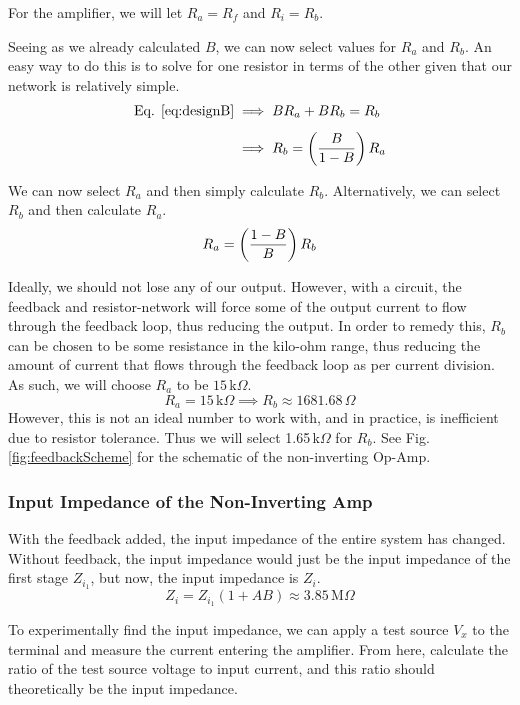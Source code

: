 \documentclass[lettersize,journal]{IEEEtran}
\begin{document}
For the amplifier, we will let $R_a = R_f$ and $R_i = R_b$.

Seeing as we already calculated $B$, we can now select values for $R_a$ and $R_b$. 
An easy way to do this is to solve for one resistor in terms of the other given 
that our network is relatively simple.
\begin{align}
  \text{Eq. \eqref{eq:designB}} &\implies BR_a + BR_b = R_b \\[1ex]
                                &\implies R_b = \left(\frac{B}{1-B}\right) R_a
\end{align}

We can now select $R_a$ and then simply calculate $R_b$. Alternatively, we can 
select $R_b$ and then calculate $R_a$.
\begin{equation}
  R_a = \left(\frac{1-B}{B}\right) R_b \\[1ex]
\end{equation}

Ideally, we should not lose any of our output. However, with a circuit, the 
feedback and resistor-network will force some of the output current to flow 
through the feedback loop, thus reducing the output. In order to remedy this, 
$R_b$ can be chosen to be some resistance in the kilo-ohm range, thus 
reducing the amount of current that flows through the feedback loop as 
per current division. As such, we will choose $R_a$ to be $15\,$k$\Omega$. 
\begin{equation}
  R_a = 15\,\text{k}\Omega \implies R_b \approx 1681.68\,\Omega
\end{equation}
However, this is not an ideal number to work with, and in practice, is 
inefficient due to resistor tolerance. Thus we will 
select 1.65$\,$k$\Omega$ for $R_b$. See Fig. \ref{fig:feedbackScheme}
for the schematic of the non-inverting Op-Amp.

\subsubsection{Input Impedance of the Non-Inverting Amp}
With the feedback added, the input impedance of the entire 
system has changed. Without feedback, the input impedance 
would just be the input impedance of the first stage $Z_{i_1}$, 
but now, the input impedance is $Z_i$.
\begin{equation}
  \label{eq:inputImpedance}
  Z_i = Z_{i_1} (1 + AB) \approx 3.85\,\text{M}\Omega
\end{equation}

To experimentally find the input impedance, we can apply a test source $V_x$ to the 
terminal and measure the current 
entering the amplifier. From here, calculate the ratio of the test source 
voltage to input current, and this ratio should theoretically be the 
input impedance. 
\end{document}
